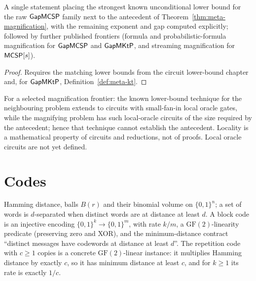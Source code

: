 \begin{theorem}
  \label{thm:meta-magnification-comparison}
  A single statement placing the strongest known unconditional lower bound for
  the raw $\mathsf{GapMCSP}$ family next to the antecedent of
  Theorem~\ref{thm:meta-magnification}, with the remaining exponent and gap
  computed explicitly; followed by further published frontiers (formula and
  probabilistic-formula magnification for $\mathsf{GapMCSP}$ and $\mathsf{GapMKtP}$,
  and streaming magnification for $\mathsf{MCSP}[s]$).
\end{theorem}
\begin{proof}
  Requires the matching lower bounds from the circuit lower-bound chapter and,
  for $\mathsf{GapMKtP}$, Definition~\ref{def:meta-kt}.
\end{proof}

\begin{theorem}
  \label{thm:meta-locality-barrier}
  \notready
  For a selected magnification frontier: the known lower-bound technique for
  the neighbouring problem extends to circuits with small-fan-in local oracle
  gates, while the magnifying problem has such local-oracle circuits of the
  size required by the antecedent; hence that technique cannot establish the
  antecedent. Locality is a mathematical property of circuits and reductions,
  not of proofs. Local oracle circuits are not yet defined.
\end{theorem}

\section{Codes}

\begin{definition}
  \label{def:meta-hamming}
  \leanok
  Hamming distance, balls $B(r)$ and their binomial volume on $\{0,1\}^n$; a
  set of words is $d$-separated when distinct words are at distance at least
  $d$. A block code is an injective encoding $\{0,1\}^k \to \{0,1\}^m$, with
  rate $k/m$, a $\mathrm{GF}(2)$-linearity predicate (preserving zero and
  XOR), and the minimum-distance contract ``distinct messages have codewords
  at distance at least $d$''. The repetition code with $c \ge 1$ copies is a
  concrete $\mathrm{GF}(2)$-linear instance: it multiplies Hamming distance by
  exactly $c$, so it has minimum distance at least $c$, and for $k \ge 1$ its
  rate is exactly $1/c$.
\end{definition}

